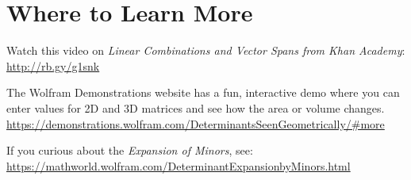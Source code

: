 \section{Where to Learn More}
Watch this video on \emph {Linear Combinations and Vector Spans from Khan Academy}: \url{http://rb.gy/g1snk}

The Wolfram Demonstrations website has a fun, interactive demo where you can enter values for 2D and 3D matrices and see how the area or volume changes. 
\url{https://demonstrations.wolfram.com/DeterminantsSeenGeometrically/#more}

If you curious about the \emph {Expansion of Minors}, see:
\url {https://mathworld.wolfram.com/DeterminantExpansionbyMinors.html}